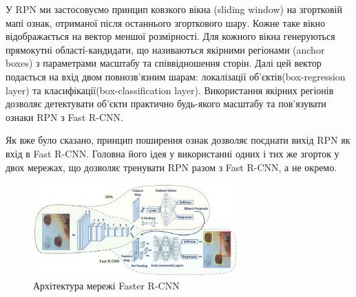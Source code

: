 У RPN ми застосовуємо принцип ковзкого вікна (sliding window) на згортковій мапі ознак,
отриманої після останнього згорткового шару. Кожне таке вікно відображається
на вектор меншої розмірності. Для кожного вікна генеруються прямокутні області-кандидати,
що називаються якірними регіонами (anchor boxes) з параметрами масштабу та співвідношення сторін.
Далі цей вектор подається на вхід двом повнозв'язним
шарам: локалізації об'єктів(box-regression layer) та класифікації(box-classification layer).
Використання якірних регіонів дозволяє детектувати об'єкти практично будь-якого масштабу та
пов'язувати ознаки RPN з Fast R-CNN.

Як вже було сказано, принцип поширення ознак дозволяє поєднати вихід RPN як вхід в Fast R-CNN.
Головна його ідея у використанні одних і тих же згорток у двох мережах, що дозволяє тренувати
RPN разом  з Fast R-CNN,  а не окремо.

\begin{figure}[H]
    \centering
    \includegraphics[width=0.7\textwidth]{images/cnn_faster_rcnn_architecture}
    \caption{Архітектура мережі Faster R-CNN \cite{faster_rcnn_web_article}
        \label{fig:cnn:faster_rcnn_architecture}
    }
\end{figure}


\clearpage